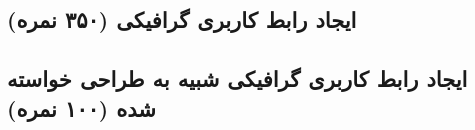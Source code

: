 \subsection{ایجاد رابط کاربری گرافیکی (۳۵۰ نمره)}

\subsection{ایجاد رابط کاربری گرافیکی شبیه به طراحی خواسته شده (۱۰۰ نمره)}